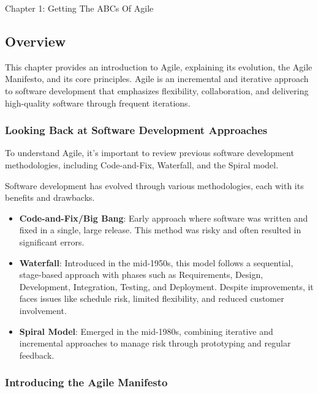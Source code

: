 \begin{notes}{Chapter 1: Getting The ABCs Of Agile}
    \subsection*{Overview}

    This chapter provides an introduction to Agile, explaining its evolution, the Agile Manifesto, and its core principles. Agile is an incremental and iterative approach to software development that 
    emphasizes flexibility, collaboration, and delivering high-quality software through frequent iterations.
    
    \subsubsection*{Looking Back at Software Development Approaches}
    
    To understand Agile, it's important to review previous software development methodologies, including Code-and-Fix, Waterfall, and the Spiral model.
    
    \begin{highlight}
    
        Software development has evolved through various methodologies, each with its benefits and drawbacks.
        
        \begin{itemize}
            \item \textbf{Code-and-Fix/Big Bang}: Early approach where software was written and fixed in a single, large release. This method was risky and often resulted in significant errors.
            \item \textbf{Waterfall}: Introduced in the mid-1950s, this model follows a sequential, stage-based approach with phases such as Requirements, Design, Development, Integration, Testing, 
            and Deployment. Despite improvements, it faces issues like schedule risk, limited flexibility, and reduced customer involvement.
            \item \textbf{Spiral Model}: Emerged in the mid-1980s, combining iterative and incremental approaches to manage risk through prototyping and regular feedback.
        \end{itemize}
    
    \end{highlight}
    
    \subsubsection*{Introducing the Agile Manifesto}
    

\end{notes}
